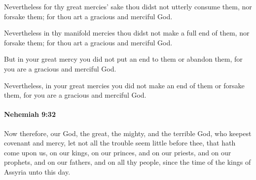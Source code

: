 			Nevertheless for thy great mercies’ sake thou didst not utterly consume them, nor forsake them; for thou art a gracious and merciful God.

			\begin{versebox}
					\item[BHS] 
					\item[LXX] 
					\item[ASV] Nevertheless in thy manifold mercies thou didst not make a full end of them, nor forsake them; for thou art a gracious and merciful God.
					\item[NIV] But in your great mercy you did not put an end to them or abandon them, for you are a gracious and merciful God.
					\item[NRSV] Nevertheless, in your great mercies you did not make an end of them or forsake them, for you are a gracious and merciful God.
			\end{versebox}

		\paragraph{Nehemiah 9:32} %
			\label{NEHEMIAH-9-32}

			Now therefore, our God, the great, the mighty, and the terrible God, who keepest covenant and mercy, let not all the trouble seem little before thee, that hath come upon us, on our kings, on our princes, and on our priests, and on our prophets, and on our fathers, and on all thy people, since the time of the kings of Assyria unto this day.

